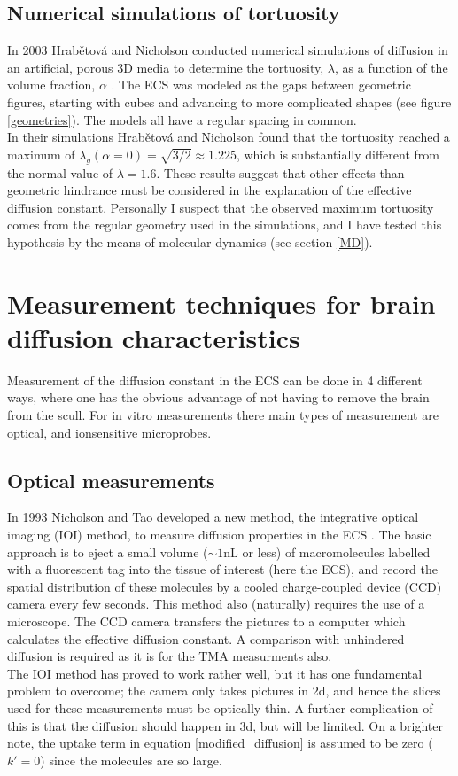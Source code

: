 \documentclass[a4paper,english, 12pt, twoside]{article}
\begin{document}
\subsection{Numerical simulations of tortuosity}
In 2003 Hrab\v{e}tov\'{a} and Nicholson conducted numerical simulations of diffusion in an artificial, porous 3D media to determine the tortuosity, $\lambda$, as a function of the volume fraction, $\alpha$ \cite{hrabetova2004contribution}. 
The ECS was modeled as the gaps between geometric figures, starting with cubes and advancing to more complicated shapes (see figure \ref{geometries}). 
The models all have a regular spacing in common. \\
In their simulations Hrab\v{e}tov\'{a} and Nicholson found that the tortuosity reached a maximum of $\lambda_g(\alpha=0) = \sqrt{3/2}\approx 1.225$, which is substantially different from the normal value of $\lambda = 1.6$. 
These results suggest that other effects than geometric hindrance must be considered in the explanation of the effective diffusion constant. 
Personally I suspect that the observed maximum tortuosity comes from the regular geometry used in the simulations, and I have tested this hypothesis by the means of molecular dynamics (see section \ref{MD}). 


\section{Measurement techniques for brain diffusion characteristics}
Measurement of the diffusion constant in the ECS can be done in 4 different ways, where one has the obvious advantage of not having to remove the brain from the scull. 
For in vitro measurements there main types of measurement are optical, and ionsensitive microprobes. 

\subsection{Optical measurements}
In 1993 Nicholson and Tao developed a new method, the integrative optical imaging (IOI) method, to measure diffusion properties in the ECS \cite{nicholson1993hindered} \cite{nicholson2001diffusion}. 
The basic approach is to eject a small volume ($\sim 1$nL or less) of macromolecules labelled with a fluorescent tag into the tissue of interest (here the ECS), and record the spatial distribution of these molecules by a cooled charge-coupled device (CCD) camera every few seconds. 
This method also (naturally) requires the use of a microscope. 
The CCD camera transfers the pictures to a computer which calculates the effective diffusion constant. 
A comparison with unhindered diffusion is required as it is for the TMA measurments also. \\
The IOI method has proved to work rather well, but it has one fundamental problem to overcome; the camera only takes pictures in 2d, and hence the slices used for these measurements must be optically thin. 
A further complication of this is that the diffusion should happen in 3d, but will be limited. 
On a brighter note, the uptake term in equation \ref{modified_diffusion} is assumed to be zero ($k' = 0$) since the molecules are so large.
\end{document}
